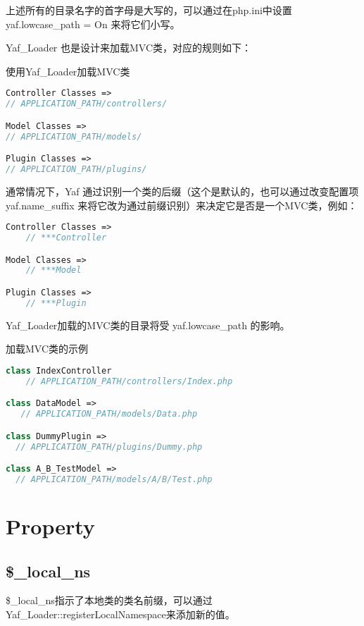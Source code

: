 上述所有的目录名字的首字母是大写的，可以通过在php.ini中设置 yaf.lowcase\_path = On 来将它们小写。

Yaf\_Loader 也是设计来加载MVC类，对应的规则如下：

\begin{example}
使用Yaf\_Loader加载MVC类
\begin{lstlisting}[language=PHP]
Controller Classes =>
// APPLICATION_PATH/controllers/

Model Classes =>
// APPLICATION_PATH/models/

Plugin Classes =>
// APPLICATION_PATH/plugins/
\end{lstlisting}
\end{example}

通常情况下，Yaf 通过识别一个类的后缀（这个是默认的，也可以通过改变配置项 yaf.name\_suffix 来将它改为通过前缀识别）来决定它是否是一个MVC类，例如：

\begin{lstlisting}[language=PHP]
Controller Classes =>
    // ***Controller

Model Classes =>
    // ***Model

Plugin Classes =>
    // ***Plugin
\end{lstlisting}


Yaf\_Loader加载的MVC类的目录将受 yaf.lowcase\_path 的影响。

\begin{example}
加载MVC类的示例
\begin{lstlisting}[language=PHP]
class IndexController
    // APPLICATION_PATH/controllers/Index.php

class DataModel =>
   // APPLICATION_PATH/models/Data.php

class DummyPlugin =>
  // APPLICATION_PATH/plugins/Dummy.php

class A_B_TestModel =>
  // APPLICATION_PATH/models/A/B/Test.php
\end{lstlisting}
\end{example}



\section{Property}


\subsection{\$\_local\_ns}

\$\_local\_ns指示了本地类的类名前缀，可以通过Yaf\_Loader::registerLocalNamespace来添加新的值。

